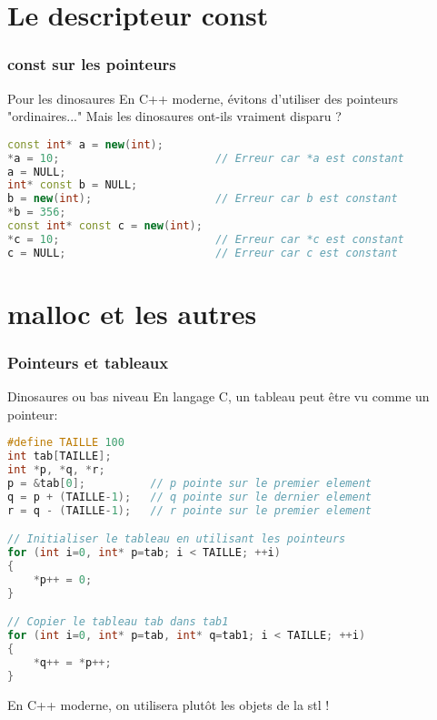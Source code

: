 \documentclass{beamer}
\begin{document}
\section{Le descripteur const}

\begin{frame}[fragile=singleslide,shrink=20]
\frametitle {const sur les pointeurs}

\begin{block}{Pour les dinosaures}
En C++ moderne, évitons d'utiliser des pointeurs "ordinaires..." Mais les dinosaures ont-ils vraiment disparu ?
\end{block}

\begin{lstlisting}[language=c++]
const int* a = new(int);
*a = 10;                        // Erreur car *a est constant
a = NULL;
int* const b = NULL;
b = new(int);                   // Erreur car b est constant
*b = 356;
const int* const c = new(int);
*c = 10;                        // Erreur car *c est constant
c = NULL;                       // Erreur car c est constant
\end{lstlisting}

\end{frame}

\section{malloc et les autres}

\begin{frame}[fragile=singleslide,shrink=20]
\frametitle{Pointeurs et tableaux}

\begin{block}{Dinosaures ou bas niveau}
En langage C, un tableau peut être vu comme un pointeur:
\end{block}

\begin{lstlisting}[language=c++]
#define TAILLE 100
int tab[TAILLE];
int *p, *q, *r;
p = &tab[0];          // p pointe sur le premier element
q = p + (TAILLE-1);   // q pointe sur le dernier element
r = q - (TAILLE-1);   // r pointe sur le premier element

// Initialiser le tableau en utilisant les pointeurs
for (int i=0, int* p=tab; i < TAILLE; ++i)
{
    *p++ = 0;
}

// Copier le tableau tab dans tab1
for (int i=0, int* p=tab, int* q=tab1; i < TAILLE; ++i)
{
    *q++ = *p++;
}
\end{lstlisting}

\begin{block}{}
En C++ moderne, on utilisera plutôt les objets de la stl !
\end{block}
\end{frame}
\end{document}

